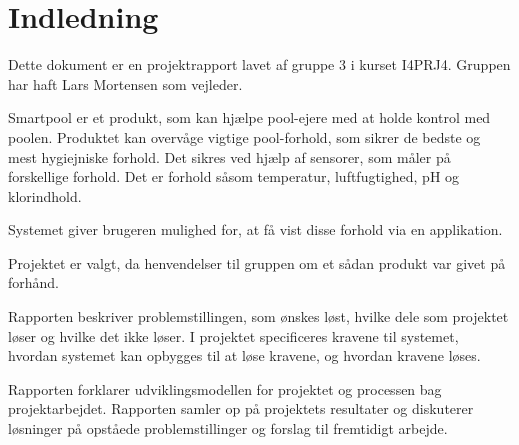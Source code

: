 \chapter{Indledning}





Dette dokument er en projektrapport lavet af gruppe 3 i kurset I4PRJ4. Gruppen har haft Lars Mortensen som vejleder. 

Smartpool er et produkt, som kan hjælpe pool-ejere med at holde kontrol med poolen. Produktet kan overvåge vigtige pool-forhold, som sikrer de bedste og mest hygiejniske forhold. Det sikres ved hjælp af sensorer, som måler på forskellige forhold. Det er forhold såsom temperatur, luftfugtighed, pH og klorindhold. 

Systemet giver brugeren mulighed for, at få vist disse forhold via en applikation.

Projektet er valgt, da henvendelser til gruppen om et sådan produkt var givet på forhånd. 

Rapporten beskriver problemstillingen, som ønskes løst, hvilke dele som projektet løser og hvilke det ikke løser. I projektet specificeres kravene til systemet, hvordan systemet kan opbygges til at løse kravene, og hvordan kravene løses. 

Rapporten forklarer udviklingsmodellen for projektet og processen bag projektarbejdet. Rapporten samler op på projektets resultater og diskuterer løsninger på opståede problemstillinger og forslag til fremtidigt arbejde. 


